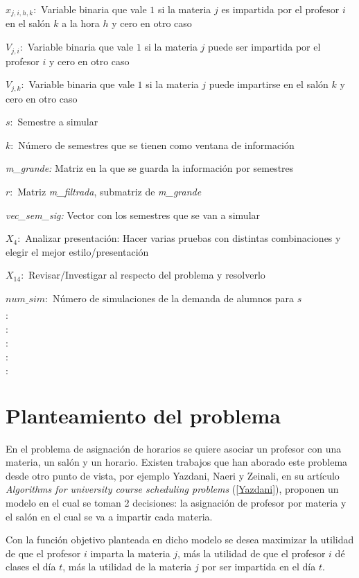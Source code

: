 $x_{j,i,h,k}:$ Variable binaria que vale $1$ si la materia $j$ es impartida por el profesor $i$ en el salón $k$ a la hora $h$ y cero en otro caso

$V_{j,i}:$ Variable binaria que vale $1$ si la materia $j$ puede ser impartida por  el profesor $i$ y cero en otro caso

$V_{j,k}:$ Variable binaria que vale $1$ si la materia $j$ puede impartirse en el salón $k$ y cero en otro caso

$s:$ Semestre a simular

$k:$ Número de semestres que se tienen como ventana de información

\textit{m\_grande:} Matriz en la que se guarda la información por semestres

$r:$ Matriz \textit{m\_filtrada}, submatriz de \textit{m\_grande}

\textit{vec\_sem\_sig:} Vector con los semestres que se van a simular

$X_{4}:$ Analizar presentación: Hacer varias pruebas con distintas combinaciones y elegir el mejor estilo/presentación

$X_{14}:$ Revisar/Investigar al respecto del problema y resolverlo

$num\_sim:$ Número de simulaciones de la demanda de alumnos para $s$

$:$ 

$:$ 

$:$ 

$:$ 

$:$ 

\section{Planteamiento del problema}

En el problema de asignación de horarios se quiere asociar un profesor con una materia, un salón y un horario. Existen trabajos que han aborado este problema desde otro punto de vista, por ejemplo Yazdani, Naeri y Zeinali, en su artículo \textit{Algorithms for university course scheduling problems} (\ref{Yazdani}), proponen un modelo en el cual se toman 2 decisiones: la asignación de profesor por materia y el salón en el cual se va a impartir cada materia.

Con la función objetivo planteada en dicho modelo se desea maximizar la utilidad de que el profesor $i$ imparta la materia $j$, más la utilidad de que el profesor $i$ dé clases el día $t$, más la utilidad de la materia $j$ por ser impartida en el día $t$.

